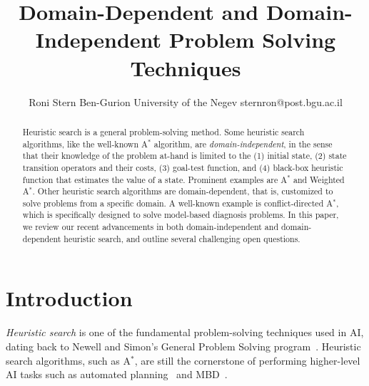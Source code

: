 \documentclass{article}
\title{Domain-Dependent and Domain-Independent Problem Solving Techniques}
\author{Roni Stern
\affiliations
Ben-Gurion University of the Negev
\emails
sternron@post.bgu.ac.il
}
\newcommand{\astar}{A$^*$\xspace}
\newcommand{\mbd}{\ac{MBD}\xspace}
\newcommand{\AI}{\ac{AI}\xspace}
\begin{document}
\maketitle



\begin{abstract}
Heuristic search is a general problem-solving method. 
Some heuristic search algorithms, like the well-known \astar algorithm, are \emph{domain-independent}, in the sense that their knowledge of the problem at-hand is limited to the
(1) initial state, 
(2) state transition operators and their costs, 
(3) goal-test function, 
and (4) black-box heuristic function that estimates the value of a state. 
Prominent examples are \astar and Weighted \astar. 
Other heuristic search algorithms are domain-dependent, that is, customized to solve problems from a specific domain. 
A well-known example is conflict-directed \astar, which is specifically designed to solve model-based diagnosis problems. 
In this paper, we review our recent advancements in both domain-independent and domain-dependent heuristic search, and outline several challenging open questions. 
 
\end{abstract}



\section{Introduction}
\acresetall 


\emph{Heuristic search} is one of the fundamental problem-solving techniques used in \AI, dating back to Newell and Simon's General Problem Solving program~\cite{newell1959report}. Heuristic search algorithms, such as \astar, are still the cornerstone of performing higher-level \AI tasks such as automated planning~\cite{bonet2001planning} and \mbd~\cite{reiter1987theory,de1987diagnosing}. 
\end{document}
